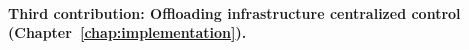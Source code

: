 

\paragraph{Third contribution: Offloading infrastructure centralized control (Chapter~\ref{chap:implementation}).}

